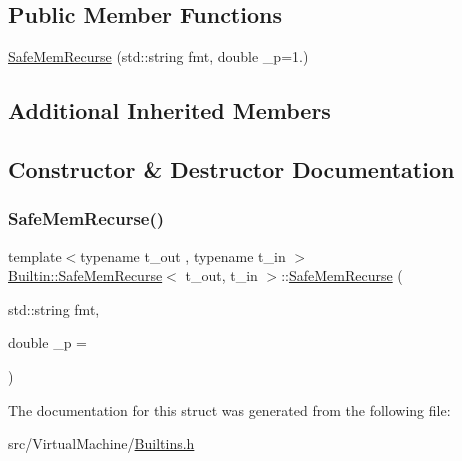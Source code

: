 \subsection*{Public Member Functions}
\begin{DoxyCompactItemize}
\item 
\hyperlink{struct_builtin_1_1_safe_mem_recurse_a1ee433d426eadf08429665c1c6793697}{Safe\+Mem\+Recurse} (std\+::string fmt, double \+\_\+p=1.)
\end{DoxyCompactItemize}
\subsection*{Additional Inherited Members}


\subsection{Constructor \& Destructor Documentation}
\mbox{\label{struct_builtin_1_1_safe_mem_recurse_a1ee433d426eadf08429665c1c6793697}} 
\subsubsection{\texorpdfstring{Safe\+Mem\+Recurse()}{SafeMemRecurse()}}
{\footnotesize\ttfamily template$<$typename t\+\_\+out , typename t\+\_\+in $>$ \\
\hyperlink{struct_builtin_1_1_safe_mem_recurse}{Builtin\+::\+Safe\+Mem\+Recurse}$<$ t\+\_\+out, t\+\_\+in $>$\+::\hyperlink{struct_builtin_1_1_safe_mem_recurse}{Safe\+Mem\+Recurse} (\begin{DoxyParamCaption}\item[{std\+::string}]{fmt,  }\item[{double}]{\+\_\+p = {} }\end{DoxyParamCaption})\hspace{0.3cm}{\ttfamily [inline]}}



The documentation for this struct was generated from the following file\+:\begin{DoxyCompactItemize}
\item 
src/\+Virtual\+Machine/\hyperlink{_builtins_8h}{Builtins.\+h}\end{DoxyCompactItemize}
